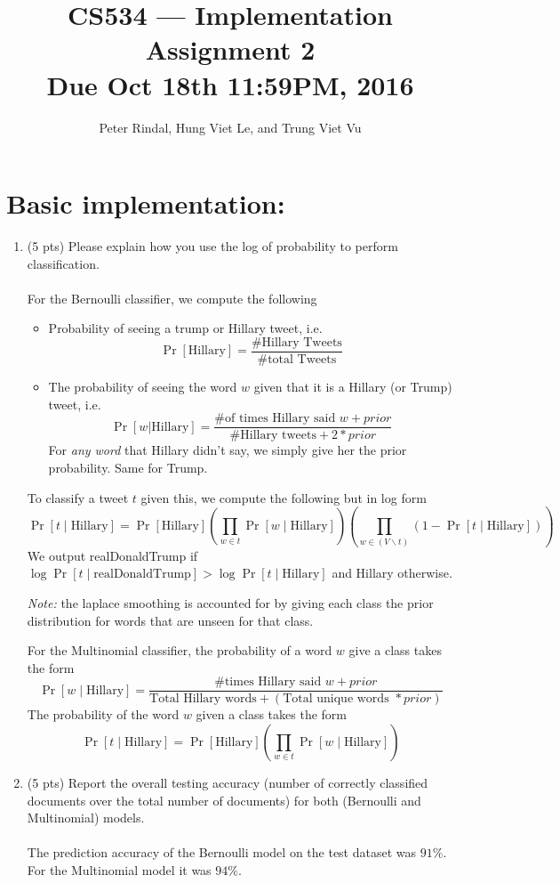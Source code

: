 \documentclass[]{article}
\title{CS534 — Implementation Assignment 2 \\ \small Due Oct 18th 11:59PM, 2016}
\author{Peter Rindal, Hung Viet Le, and Trung Viet Vu}
\begin{document}
\maketitle


\section{Basic implementation:}

\begin{enumerate}
	\item (5 pts) Please explain how you use the log of probability to perform classification.\\
	\\
	For the Bernoulli classifier, we compute the following
	\begin{itemize}
		\item Probability of seeing a trump or Hillary tweet, i.e. 
		\[
			\Pr[\mbox{Hillary}] = \frac{\mbox{\# Hillary Tweets}}{\mbox{\# total Tweets}}
		\]
		
		\item The probability of seeing the word $w$ given that it is a Hillary (or Trump) tweet, i.e.
		\[
			\Pr[w | \mbox{Hillary}] = \frac{\mbox{\# of times Hillary said } w  + prior}{\mbox{\# Hillary tweets} + 2 * prior}
		\]
		For \emph{any word} that Hillary didn't say, we simply give her the prior probability. Same for Trump.
	\end{itemize}
	To classify a tweet $t$ given this, we compute the following but in log form
	\[
		\Pr[t \mid \mbox{Hillary}] = \Pr[\mbox{Hillary}]\left(\prod_{w\in t} \Pr[w \mid \mbox{Hillary}]\right)  \left( \prod_{w\in (V \backslash t)} (1-\Pr[ t \mid \mbox{Hillary}]) \right) 
	\]
	We output realDonaldTrump if $\log \Pr[t \mid \mbox{realDonaldTrump}]>\log \Pr[t \mid \mbox{Hillary}]$ and Hillary otherwise. 
	
	\emph{Note:} the laplace smoothing is accounted for by giving each class the prior distribution for words that are unseen for that class.
	
	
	For the Multinomial classifier, the probability of a word $w$ give a class  takes the form 
	\[
		\Pr[w \mid \mbox{Hillary}] = \frac{\mbox{\# times Hillary said } w + prior}{\mbox{Total Hillary words} + (\mbox{Total unique words }* prior)}
	\]
	The probability of the word $w$ given a class takes the form 
	\[
			\Pr[t \mid \mbox{Hillary}] = \Pr[\mbox{Hillary}]\left( \prod_{w\in t}\Pr[w \mid \mbox{Hillary}] \right)
	\]
	
	\item (5 pts) Report the overall testing accuracy (number of correctly classified documents over the total number of documents) for both (Bernoulli and Multinomial) models.\\
	\\
	The prediction accuracy of the Bernoulli model on the test dataset was $91\%$. For the Multinomial model it was $94\%$.
	

\end{enumerate}
\end{document}
